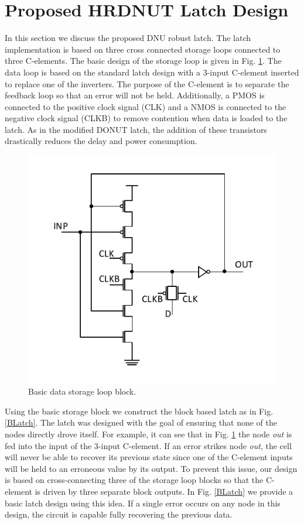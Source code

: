 \section{Proposed HRDNUT Latch Design} \label{Proposed}
In this section we discuss the proposed DNU robust latch. The latch implementation is based on three cross connected storage loops connected to three C-elements. The basic design of the storage loop is given in Fig. \ref{Block}. The data loop is based on the standard latch design with a 3-input C-element inserted to replace one of the inverters. The purpose of the C-element is to separate the feedback loop so that an error will not be held. Additionally, a PMOS is connected to the positive clock signal (CLK) and a NMOS is connected to the negative clock signal (CLKB) to remove contention when data is loaded to the latch. As in the modified DONUT latch, the addition of these transistors drastically reduces the delay and power consumption.    

\begin{figure}[h]
	\centering
	\includegraphics[width=0.5\linewidth]{Figures/Block}
	\caption{Basic data storage loop block.}
	\label{Block}
\end{figure} 

Using the basic storage block we construct the block based latch as in Fig. \ref{BLatch}. The latch was designed with the goal of ensuring that none of the nodes directly drove itself. For example, it can see that in Fig. \ref{Block} the node \textit{out} is fed into the input of the 3-input C-element. If an error strikes node \textit{out}, the cell will never be able to recover its previous state since one of the C-element inputs will be held to an erroneous value by its output. To prevent this issue, our design is based on cross-connecting three of the storage loop blocks so that the C-element is driven by three separate block outputs. In Fig. \ref{BLatch} we provide a basic latch design using this idea. If a single error occurs on any node in this design, the circuit is capable fully recovering the previous data. 

